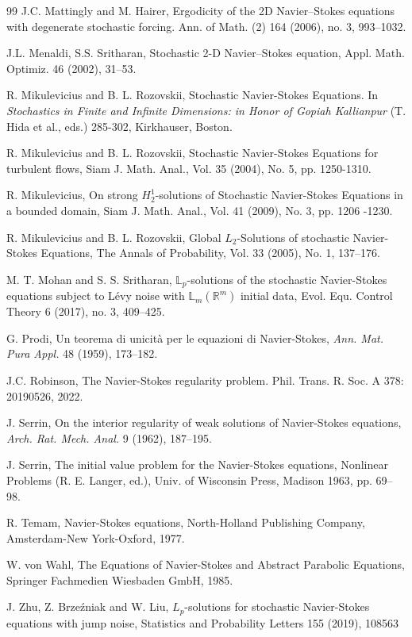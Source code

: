 \documentclass[11pt,reqno]{amsart}
\theoremstyle{definition}
\theoremstyle{remark}
\newcommand\bL{\mathbb{L}}
\newcommand\bR{\mathbb{R}}
\newcommand{\<}{\langle}
\renewcommand{\>}{\rangle}
\begin{document}
\begin{thebibliography}{99}
 J.C. Mattingly and M. Hairer, 
 Ergodicity of the 2D Navier--Stokes equations with degenerate stochastic forcing.  
 Ann. of Math. (2) 164 (2006), no. 3, 993--1032. 

J.L. Menaldi, S.S. Sritharan, Stochastic 2-D Navier--Stokes equation, 
Appl. Math. Optimiz. 46 (2002), 31--53.  

 R. Mikulevicius and B. L. Rozovskii, 
Stochastic Navier-Stokes Equations. In {\it Stochastics in Finite and 
Infinite Dimensions: in Honor of Gopiah Kallianpur} (T. Hida et al., eds.) 
285-302, Kirkhauser, Boston.

 R. Mikulevicius and B. L. Rozovskii, 
Stochastic Navier-Stokes Equations  for turbulent flows, 
Siam J. Math. Anal., Vol. 35 (2004), No. 5, pp. 1250-1310.

 R. Mikulevicius, On strong  $H^1_2$-solutions 
of Stochastic Navier-Stokes Equations in a bounded domain, 
Siam J. Math. Anal., Vol. 41 (2009), No. 3, pp. 1206 -1230.

 R. Mikulevicius and B. L. Rozovskii, 
Global $L_2$-Solutions of stochastic Navier-Stokes Equations, 
The Annals of Probability,  Vol. 33 (2005), No. 1, 137--176.

 
 M. T. Mohan and S. S. Sritharan, 
$\bL_p$-solutions of the stochastic Navier-Stokes equations 
subject to L\'evy noise with $\bL_m(\bR^m)$ initial data,
Evol. Equ. Control Theory 6 (2017), no. 3, 409--425.


G. Prodi, Un teorema di unicit\`a per le equazioni di Navier-Stokes,  
{\em Ann. Mat. Pura Appl.\/} 48 (1959), 173--182. 

 
 J.C. Robinson, The Navier-Stokes regularity problem. 
Phil. Trans. R. Soc. A 378: 20190526, 2022. 
 
 J. Serrin, On the interior regularity 
of weak solutions of Navier-Stokes equations, 
{\em Arch. Rat. Mech. Anal.\/} 9 (1962), 187--195. 

 J. Serrin, The initial value problem for the Navier-Stokes equations, 
Nonlinear Problems (R. E. Langer, ed.), Univ. of Wisconsin Press, Madison 1963, pp. 69--98.

 
 R. Temam, Navier-Stokes equations,  
North-Holland Publishing Company, Amsterdam-New York-Oxford, 1977.
 

 
 W. von Wahl, The Equations of Navier-Stokes and Abstract
Parabolic Equations, Springer Fachmedien Wiesbaden GmbH, 1985.
 

 J. Zhu, Z. Brze\'zniak and W. Liu, 
$L_p$-solutions for stochastic Navier-Stokes equations with jump noise, 
Statistics and Probability Letters 155 (2019), 108563


\end{thebibliography}
\end{document}
